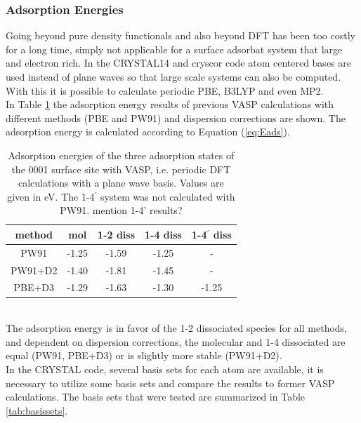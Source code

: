 \documentclass[11pt,DIV=13,BCOR=5mm,a4paper,headinclude]{scrbook}
\begin{document}
\subsubsection{Adsorption Energies}
Going beyond pure density functionals and also beyond DFT has been too costly for a long time, simply not applicable for a surface adsorbat system that large and electron rich.
In the CRYSTAL14\cite{crystal14} and cryscor\cite{cryscor} code atom centered bases are used instead of plane waves so that large scale systems can also be computed.
With this it is possible to calculate periodic PBE, B3LYP and even MP2.\\
In Table \ref{tab:vasp-results} the adsorption energy results of previous VASP calculations with different methods (PBE and PW91) and dispersion corrections are shown.
The adsorption energy is calculated according to Equation (\ref{eq:Eads}).
\begin{table}[!h]
  \centering
   \caption{Adsorption energies of the three adsorption states of the 0001 surface site with VASP, i.e.
periodic DFT calculations with a plane wave basis.
Values are given in eV.
{\color{red} The 1-4$^\prime$ system was not calculated with PW91\cite{WirthJPCC2012}.
mention 1-4' results?}}
  \begin{tabular}{c|cccc}
  \toprule
  method & mol & 1-2 diss & 1-4 diss&1-4$^\prime$ diss\\\midrule
  PW91   &-1.25 &-1.59 &-1.25 &-\\
  PW91+D2&-1.40 &-1.81 &-1.45 &-\\
  PBE+D3 &-1.29&-1.63 &-1.30 &-1.25 \\\bottomrule
  \end{tabular}
  \label{tab:vasp-results}
 \end{table}
\\
The adsorption energy is in favor of the 1-2 dissociated species for all methods, and dependent on dispersion corrections, the molecular and 1-4 dissociated are equal (PW91, PBE+D3) or is slightly more stable (PW91+D2).
\\
In the CRYSTAL code, several basis sets for each atom are available, it is necessary to utilize some basis sets and compare the results to former VASP calculations.
The basis sets that were tested are summarized in Table \ref{tab:basissets}.
\end{document}
